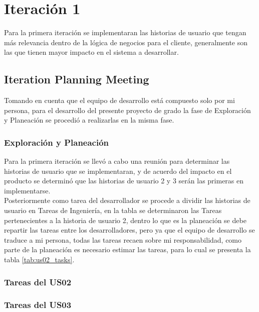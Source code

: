 \chapter{Iteración 1}
\label{chap:iteracion_1}

Para la primera iteración se implementaran las historias de usuario que tengan más relevancia dentro de la lógica de negocios para el cliente, generalmente son las que tienen mayor impacto en el sistema a desarrollar.


\section{Iteration Planning Meeting}
\label{sec:Iteration Planning Meeting}


Tomando en cuenta que el equipo de desarrollo está compuesto solo por mi persona, para el desarrollo del presente proyecto de grado la fase de Exploración y Planeación se procedió a realizarlas en la misma fase.

  \subsection{Exploración y Planeación}
  \label{sub:Exploración y Planeación}

Para la primera iteración se llevó a cabo una reunión para determinar las historias de usuario que se implementaran, y de acuerdo del impacto en el producto se determinó que las historias de usuario 2 y 3 serán las primeras en implementarse. \\

Posteriormente como tarea del desarrollador se procede a dividir las historias de usuario en Tareas de Ingeniería, en la tabla se determinaron las Tareas pertenecientes a la historia de usuario 2, dentro lo que es la planeación se debe repartir las tareas entre los desarrolladores, pero ya que el equipo de desarrollo se traduce a mi persona, todas las tareas recaen sobre mi responsabilidad, como parte de la planeación es necesario estimar las tareas, para lo cual se presenta la tabla \ref{tab:us02_tasks}. \\


  \subsection{Tareas del US02}
  \label{sub:us02_tasks}

    

  \subsection{Tareas del US03}
  \label{sub:us03_tasks}

